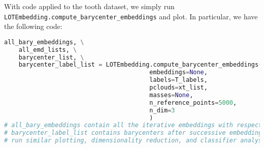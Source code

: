 With code applied to the tooth dataset, we simply run \texttt{LOTEmbedding.compute\_barycenter\_embeddings} and plot.  In particular, we have the following code:
\begin{lstlisting}[language=Python, caption=Code for iterative barycenter generation., label={code:iterBary}]
all_bary_embeddings, \
    all_emd_lists, \
    barycenter_list, \
    barycenter_label_list = LOTEmbedding.compute_barycenter_embeddings(n_iterations=3, 
                                        embeddings=None,
                                        labels=T_labels, 
                                        pclouds=xt_list, 
                                        masses=None, 
                                        n_reference_points=5000,
                                        n_dim=3
                                        )
# all_bary_embeddings contain all the iterative embeddings with respect to the barycenters for each class
# barycenter_label_list contains barycenters after successive embeddings
# run similar plotting, dimensionality reduction, and classifier analysis as before
\end{lstlisting}


